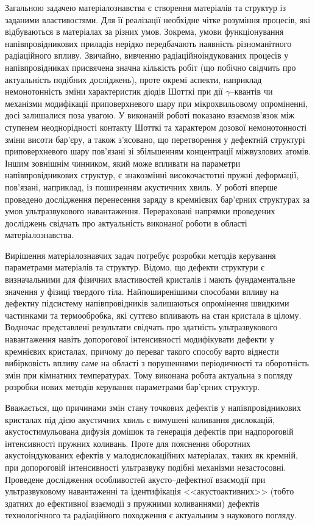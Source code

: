 Загальною задачею матеріалознавства є створення матеріалів та структур із заданими властивостями.
Для її реалізації необхідне чітке розуміння процесів, які відбуваються в матеріалах за різних умов.
Зокрема, умови функціонування напівпровідникових приладів нерідко передбачають наявність різноманітного радіаційного впливу.
Звичайно, вивченню радіаційноіндукованих процесів у напівпровідниках присвячена значна кількість робіт (що побічно свідчить про актуальність подібних досліджень),
проте окремі аспекти, наприклад немонотонність зміни характеристик діодів Шотткі при дії $\gamma$--квантів чи механізми модифікації приповерхневого шару при мікрохвильовому опроміненні, досі залишалися поза увагою.
У виконаній роботі показано взаємозв'язок між ступенем неоднорідності контакту Шотткі та характером дозової немонотонності зміни висоти бар'єру, а також з'ясовано, що перетворення у дефектній структурі приповерхневого шару пов'язані зі збільшенням концентрації міжвузлових атомів.
Іншим зовнішнім чинником, який може впливати на параметри напівпровідникових структур, є знакозмінні високочастотні пружні деформації, пов'язані, наприклад, із поширенням акустичних хвиль.
У роботі вперше проведено дослідження перенесення заряду в кремнієвих бар'єрних структурах за умов ультразвукового навантаження.
Перераховані напрямки проведених досліджень свідчать про актуальність виконаної роботи в області матеріалознавства.

Вирішення матеріалознавчих задач потребує розробки методів керування параметрами матеріалів та структур.
Відомо, що дефекти структури є визначальними для фізичних властивостей кристалів і мають фундаментальне значення у фізиці твердого тіла.
Найпоширенішими способами впливу на дефектну підсистему напівпровідників залишаються опромінення швидкими частинками та термообробка, які суттєво впливають на стан кристала в цілому.
Водночас представлені результати свідчать про здатність ультразвукового навантаження навіть допорогової інтенсивності модифікувати дефекти у кремнієвих кристалах, причому до переваг такого способу варто віднести вибірковість впливу саме на області з порушеннями періодичності та оборотність змін при кімнатних температурах.
Тому виконана робота актуальна з погляду розробки нових методів керування параметрами бар'єрних структур.

Вважається, що причинами змін стану точкових дефектів у напівпровідникових кристалах під дією акустичних хвиль є вимушені коливання дислокацій, акустостимульована дифузія домішок та генерація дефектів при надпороговій інтенсивності пружних коливань.
Проте для пояснення оборотних акустоіндукованих ефектів у малодислокаційних матеріалах, таких як кремній, при допороговій інтенсивності ультразвуку подібні механізми  незастосовні.
Проведене дослідження особливостей акусто--дефектної взаємодії при ультразвуковому навантаженні та ідентифікація <<акустоактивних>> (тобто здатних до ефективної взаємодії з пружними коливаннями) дефектів технологічного та радіаційного походження
є актуальним з наукового погляду.

